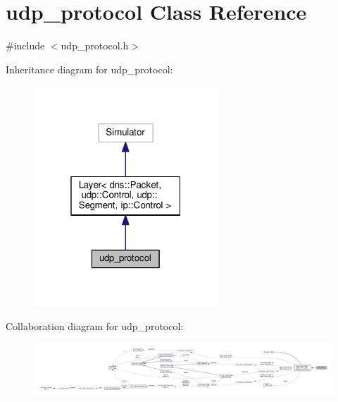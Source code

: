 \hypertarget{classudp__protocol}{}\section{udp\+\_\+protocol Class Reference}
\label{classudp__protocol}


{\ttfamily \#include $<$udp\+\_\+protocol.\+h$>$}



Inheritance diagram for udp\+\_\+protocol\+:\nopagebreak
\begin{figure}[H]
\begin{center}
\leavevmode
\includegraphics[width=196pt]{classudp__protocol__inherit__graph}
\end{center}
\end{figure}


Collaboration diagram for udp\+\_\+protocol\+:
\nopagebreak
\begin{figure}[H]
\begin{center}
\leavevmode
\includegraphics[width=350pt]{classudp__protocol__coll__graph}
\end{center}
\end{figure}
